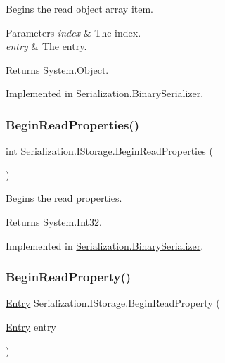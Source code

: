Begins the read object array item. 


\begin{DoxyParams}{Parameters}
{\em index} & The index.\\
\hline
{\em entry} & The entry.\\
\hline
\end{DoxyParams}
\begin{DoxyReturn}{Returns}
System.\+Object.
\end{DoxyReturn}


Implemented in \hyperlink{class_serialization_1_1_binary_serializer_ac4a4d8051a5c10d82e23fd004ad344fb}{Serialization.\+Binary\+Serializer}.

\mbox{\label{interface_serialization_1_1_i_storage_a14c84cc7b9483b89881c5caef8e4f1a0}} 
\subsubsection{\texorpdfstring{Begin\+Read\+Properties()}{BeginReadProperties()}}
{\footnotesize\ttfamily int Serialization.\+I\+Storage.\+Begin\+Read\+Properties (\begin{DoxyParamCaption}{ }\end{DoxyParamCaption})}



Begins the read properties. 

\begin{DoxyReturn}{Returns}
System.\+Int32.
\end{DoxyReturn}


Implemented in \hyperlink{class_serialization_1_1_binary_serializer_ae6b1ddb821a9809f1428640e3bd75e7b}{Serialization.\+Binary\+Serializer}.

\mbox{\label{interface_serialization_1_1_i_storage_a4dab514d85acc8b9c97934025438cccf}} 
\subsubsection{\texorpdfstring{Begin\+Read\+Property()}{BeginReadProperty()}}
{\footnotesize\ttfamily \hyperlink{class_serialization_1_1_entry}{Entry} Serialization.\+I\+Storage.\+Begin\+Read\+Property (\begin{DoxyParamCaption}\item[{\hyperlink{class_serialization_1_1_entry}{Entry}}]{entry }\end{DoxyParamCaption})}




